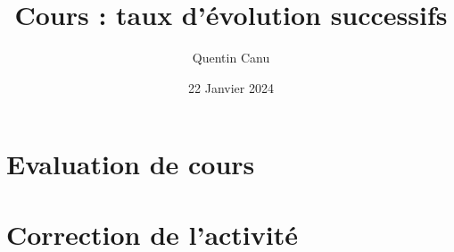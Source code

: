 \documentclass{article}
\title{Cours : taux d'évolution successifs}
\date{22 Janvier 2024}
\author{Quentin Canu}
\begin{document}
\maketitle
\section{Evaluation de cours}
\section{Correction de l'activité}
\end{document}
